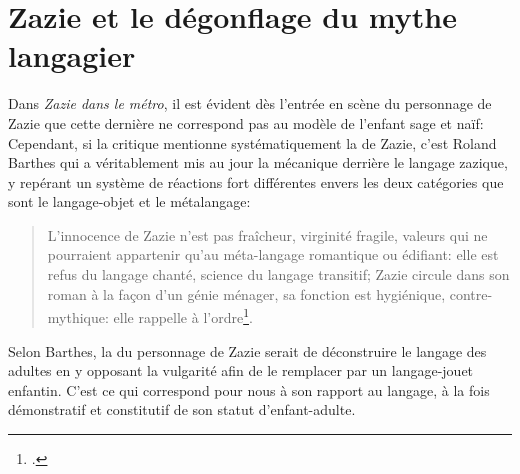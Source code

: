 \section{Zazie et le dégonflage du mythe langagier}
Dans \textit{Zazie dans le métro}, il est évident dès l'entrée en scène du personnage de Zazie que cette dernière ne correspond pas au modèle de l'enfant sage et naïf: 
Cependant, si la critique mentionne systématiquement la  de Zazie, c'est Roland Barthes qui a véritablement mis au jour la mécanique derrière le langage zazique, y repérant un système de réactions fort différentes envers les deux catégories que sont le langage-objet et le métalangage:
\begin{quote}
  \begin{singlespace}
    \small
    L'innocence de Zazie n'est pas fraîcheur, virginité fragile, valeurs qui ne pourraient appartenir qu'au méta-langage romantique ou édifiant: elle est refus du langage chanté, science du langage transitif; Zazie circule dans son roman à la façon d'un génie ménager, sa fonction est hygiénique, contre-mythique: elle rappelle à l'ordre\footcite[129]{Barthes1964}.
    \normalsize
  \end{singlespace}
\end{quote}
Selon Barthes, la  du personnage de Zazie serait de déconstruire le langage des adultes en y opposant la vulgarité afin de le remplacer par un langage-jouet enfantin.
C'est ce qui correspond pour nous à son rapport au langage, à la fois démonstratif et constitutif de son statut d'enfant-adulte.


